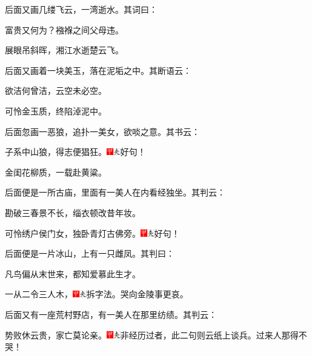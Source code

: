 后面又画几缕飞云，一湾逝水。其词曰：

富贵又何为？襁褓之间父母违。

展眼吊斜晖，湘江水逝楚云飞。

后面又画着一块美玉，落在泥垢之中。其断语云：

欲洁何曾洁，云空未必空。

可怜金玉质，终陷淖泥中。

后面忽画一恶狼，追扑一美女，欲啖之意。其书云：

子系中山狼，得志便猖狂。{\includegraphics[width=3mm]{../Images/00002}\includegraphics[width=3mm]{../Images/00012}\footnotesize \kaishu 好句！}

金闺花柳质，一载赴黄粱。

后面便是一所古庙，里面有一美人在内看经独坐。其判云：

勘破三春景不长，缁衣顿改昔年妆。

可怜绣户侯门女，独卧青灯古佛旁。{\includegraphics[width=3mm]{../Images/00002}\includegraphics[width=3mm]{../Images/00012}\footnotesize \kaishu 好句！}

后面便是一片冰山，上有一只雌凤。其判曰：

凡鸟偏从末世来，都知爱慕此生才。

一从二令三人木，{\includegraphics[width=3mm]{../Images/00002}\includegraphics[width=3mm]{../Images/00012}\footnotesize \kaishu 拆字法。}哭向金陵事更哀。

后面又有一座荒村野店，有一美人在那里纺绩。其判云：

势败休云贵，家亡莫论亲。{\includegraphics[width=3mm]{../Images/00002}\includegraphics[width=3mm]{../Images/00012}\footnotesize \kaishu 非经历过者，此二句则云纸上谈兵。过来人那得不哭！}


